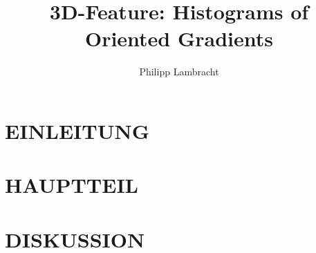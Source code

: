 \documentclass[a4paper, 10pt, conference]{ieeeconf_de}
\title{\LARGE \bf
3D-Feature: Histograms of Oriented Gradients
}
\author{Philipp Lambracht}
\begin{document}
\maketitle
\thispagestyle{empty}
\pagestyle{empty}



\begin{abstract}

	

\end{abstract}


\section{EINLEITUNG}

	

\section{HAUPTTEIL}




\section{DISKUSSION}

   

\addtolength{\textheight}{-12cm}  %




\end{document}
